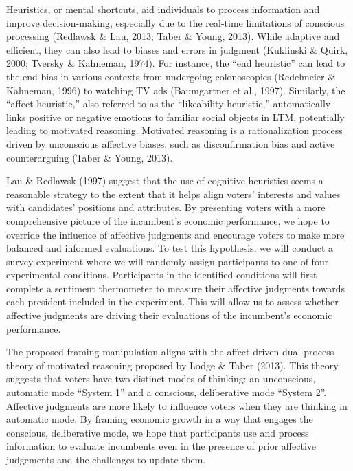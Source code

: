\documentclass[
]{article}
\begin{document}
Heuristics, or mental shortcuts, aid individuals to process information
and improve decision-making, especially due to the real-time limitations
of conscious processing (Redlawsk \& Lau, 2013; Taber \& Young, 2013).
While adaptive and efficient, they can also lead to biases and errors in
judgment (Kuklinski \& Quirk, 2000; Tversky \& Kahneman, 1974). For
instance, the ``end heuristic'' can lead to the end bias in various
contexts from undergoing colonoscopies (Redelmeier \& Kahneman, 1996) to
watching TV ads (Baumgartner et al., 1997). Similarly, the ``affect
heuristic,'' also referred to as the ``likeability heuristic,''
automatically links positive or negative emotions to familiar social
objects in LTM, potentially leading to motivated reasoning. Motivated
reasoning is a rationalization process driven by unconscious affective
biases, such as disconfirmation bias and active counterarguing (Taber \&
Young, 2013).

Lau \& Redlawsk (1997) suggest that the use of cognitive heuristics
seems a reasonable strategy to the extent that it helps align voters'
interests and values with candidates' positions and attributes. By
presenting voters with a more comprehensive picture of the incumbent's
economic performance, we hope to override the influence of affective
judgments and encourage voters to make more balanced and informed
evaluations. To test this hypothesis, we will conduct a survey
experiment where we will randomly assign participants to one of four
experimental conditions. Participants in the identified conditions will
first complete a sentiment thermometer to measure their affective
judgments towards each president included in the experiment. This will
allow us to assess whether affective judgments are driving their
evaluations of the incumbent's economic performance.

The proposed framing manipulation aligns with the affect-driven
dual-process theory of motivated reasoning proposed by Lodge \& Taber
(2013). This theory suggests that voters have two distinct modes of
thinking: an unconscious, automatic mode ``System 1'' and a conscious,
deliberative mode ``System 2''. Affective judgments are more likely to
influence voters when they are thinking in automatic mode. By framing
economic growth in a way that engages the conscious, deliberative mode,
we hope that participants use and process information to evaluate
incumbents even in the presence of prior affective judgements and the
challenges to update them.
\end{document}
